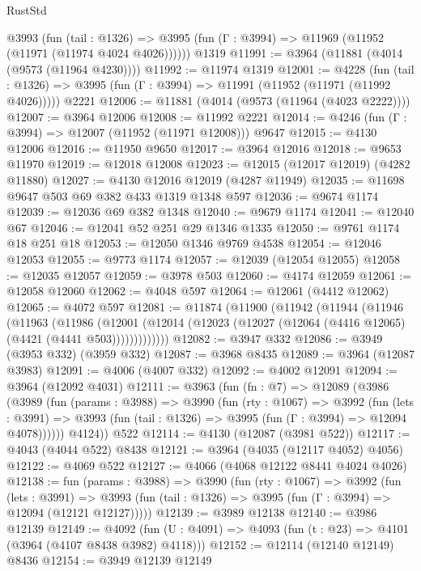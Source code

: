 \begin{lexlean}{RustStd}
\begin{coremodule}
{\begin{coremodule}
{{{{{{{{{{{{{{{{{{{{{{{{{{{{{{{{{{{{{{    @3993
      (fun (tail : @1326) =>
      @3995 (fun (Γ : @3994) => @11969 (@11952 (@11971 (@11974 @4024 @4026))))))
    @1319
@11991 := @3964 (@11881 (@4014 (@9573 (@11964 @4230))))
@11992 := @11974 @1319
@12001 := @4228
    (fun (tail : @1326) => @3995 (fun (Γ : @3994) => @11991 (@11952 (@11971 (@11992 @4026)))))
    @2221
@12006 := @11881 (@4014 (@9573 (@11964 (@4023 @2222))))
@12007 := @3964 @12006
@12008 := @11992 @2221
@12014 := @4246 (fun (Γ : @3994) => @12007 (@11952 (@11971 @12008))) @9647
@12015 := @4130 @12006
@12016 := @11950 @9650
@12017 := @3964 @12016
@12018 := @9653 @11970
@12019 := @12018 @12008
@12023 := @12015 (@12017 @12019) (@4282 @11880)
@12027 := @4130 @12016 @12019 (@4287 @11949)
@12035 := @11698 @9647 @503 @69 @382 @433 @1319 @1348 @597
@12036 := @9674 @1174
@12039 := @12036 @69 @382 @1348
@12040 := @9679 @1174
@12041 := @12040 @67
@12046 := @12041 @52 @251 @29 @1346 @1335
@12050 := @9761 @1174 @18 @251 @18
@12053 := @12050 @1346 @9769 @4538
@12054 := @12046 @12053
@12055 := @9773 @1174
@12057 := @12039 (@12054 @12055)
@12058 := @12035 @12057
@12059 := @3978 @503
@12060 := @4174 @12059
@12061 := @12058 @12060
@12062 := @4048 @597
@12064 := @12061 (@4412 @12062)
@12065 := @4072 @597
@12081 := @11874
    (@11900
      (@11942
        (@11944
          (@11946
            (@11963
              (@11986
                (@12001
                  (@12014 (@12023 (@12027 (@12064 (@4416 @12065) (@4421 (@4441 @503)))))))))))))
@12082 := @3947 @332
@12086 := @3949 (@3953 @332) (@3959 @332)
@12087 := @3968 @8435
@12089 := @3964 (@12087 @3983)
@12091 := @4006 (@4007 @332)
@12092 := @4002 @12091
@12094 := @3964 (@12092 @4031)
@12111 := @3963
    (fun (fn : @7) =>
    @12089
      (@3986
        (@3989
          (fun (params : @3988) =>
          @3990
            (fun (rty : @1067) =>
            @3992
              (fun (lets : @3991) =>
              @3993 (fun (tail : @1326) => @3995 (fun (Γ : @3994) => @12094 @4078))))))
        @4124))
    @522
@12114 := @4130 (@12087 (@3981 @522))
@12117 := @4043 (@4044 @522) @8438
@12121 := @3964 (@4035 (@12117 @4052) @4056)
@12122 := @4069 @522
@12127 := @4066 (@4068 @12122 @8441 @4024 @4026)
@12138 := fun (params : @3988) =>
  @3990
    (fun (rty : @1067) =>
    @3992
      (fun (lets : @3991) =>
      @3993 (fun (tail : @1326) => @3995 (fun (Γ : @3994) => @12094 (@12121 @12127)))))
@12139 := @3989 @12138
@12140 := @3986 @12139
@12149 := @4092
    (fun (U : @4091) => @4093 (fun (t : @23) => @4101 (@3964 (@4107 @8438 @3982) @4118)))
@12152 := @12114 (@12140 @12149) @8436
@12154 := @3949 @12139 @12149
}}}}}}}}}}}}}}}}}}}}}}}}}}}}}}}}}}}}}}
\end{coremodule}}
\end{coremodule}
\end{lexlean}
